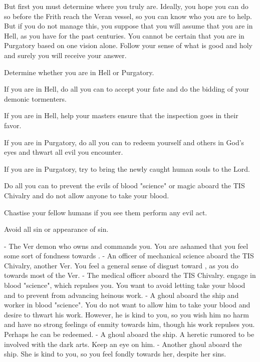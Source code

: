 \documentclass[char]{guildcamp4}
\begin{document}
But first you must determine where you truly are. Ideally, you hope you can do so before the Frith reach the Veran vessel, so you can know who you are to help. But if you do not manage this, you suppose that you will assume that you are in Hell, as you have for the past centuries. You cannot be certain that you are in Purgatory based on one vision alone. Follow your sense of what is good and holy and surely you will receive your answer.

\begin{itemz}[Goals]
	\item Determine whether you are in Hell or Purgatory.
	\item If you are in Hell, do all you can to accept your fate and do the bidding of your demonic tormenters.
	\item If you are in Hell, help your masters ensure that the inspection goes in their favor.
	\item If you are in Purgatory, do all you can to redeem yourself and others in God's eyes and thwart all evil you encounter.
	\item If you are in Purgatory, try to bring the newly caught human souls to the Lord.
	\item Do all you can to prevent the evils of blood "science" or magic aboard the TIS Chivalry and do not allow anyone to take your blood.
	\item Chastise your fellow humans if you see them perform any evil act.
	\item Avoid all sin or appearance of sin.
\end{itemz}

\begin{itemz}[Notes]
	\item 
\end{itemz}

\begin{contacts}
	\contact{\cVone{}} - The Ver demon who owns and commands you. You are ashamed that you feel some sort of fondness towards \cVone{\them}.
	\contact{\cVtwo{}} - An officer of mechanical science aboard the TIS Chivalry, another Ver. You feel a general sense of disgust toward \cVtwo{\them}, as you do towards most of the Ver.
	\contact{\cVthree{}} - The medical officer aboard the TIS Chivalry. \cVthree{\They} engage in blood "science", which repulses you. You want to avoid letting \cVthree{\them} take your blood and to prevent \cVthree{\them} from advancing \cVthree{\their} heinous work.
	\contact{\cJames{}} - A ghoul aboard the ship and worker in blood "science". You do not want to allow him to take your blood and desire to thwart his work. However, he is kind to you, so you wish him no harm and have no strong feelings of enmity towards him, though his work repulses you. Perhaps he can be redeemed.
	\contact{\cRasputin{}} - A ghoul aboard the ship. A heretic rumored to be involved with the dark arts. Keep an eye on him.  
	\contact{\cJulie{}} - Another ghoul aboard the ship. She is kind to you, so you feel fondly towards her, despite her sins. 
\end{contacts}

\end{document}
